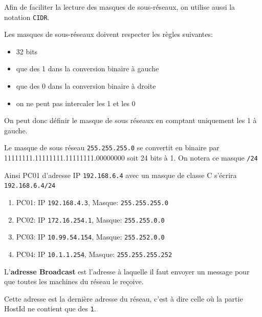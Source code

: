 \begin{definition}{}
    Afin de faciliter la lecture des masques de sous-réseaux, on utilise aussi la notation \verb+CIDR+.

	Les masques de sous-réseaux doivent respecter les règles suivantes:

	\begin{itemize}
        \item 32 bits
        \item que des 1 dans la conversion binaire à gauche
        \item que des 0 dans la conversion binaire à droite
        \item on ne peut pas intercaler les 1 et les 0
    \end{itemize}

    On peut donc définir le masque de sous réseaux en comptant uniquement les 1 à gauche.
\end{definition}


\begin{exemple}{}
         Le masque de sous réseau \verb+255.255.255.0+ se convertit en binaire par 11111111.11111111.11111111.00000000 soit 24 bits à 1. On notera ce masque \verb+/24+
        
        Ainsi PC01 d'adresse IP \verb+192.168.6.4+ avec un masque de classe C s'écrira \verb+192.168.6.4/24+
\end{exemple}

\begin{exercice_cours}{}
    \begin{enumerate}
        \item PC01: IP \verb+192.168.4.3+, Masque: \verb+255.255.255.0+ \dotfill
        \item PC02: IP \verb+172.16.254.1+, Masque: \verb+255.255.0.0+ \dotfill
        \item PC03: IP \verb+10.99.54.154+, Masque: \verb+255.252.0.0+ \dotfill
        \item PC04: IP \verb+10.1.1.254+, Masque: \verb+255.255.255.252+ \dotfill
    \end{enumerate}

\end{exercice_cours}


	\begin{definition}{}

		L'\textbf{adresse Broadcast} est l'adresse à laquelle il faut envoyer un message pour que toutes les machines du réseau le reçoive.

		Cette adresse est la dernière adresse du réseau, c'est à dire celle où la partie HostId ne contient que des \verb+1+.

	\end{definition}

